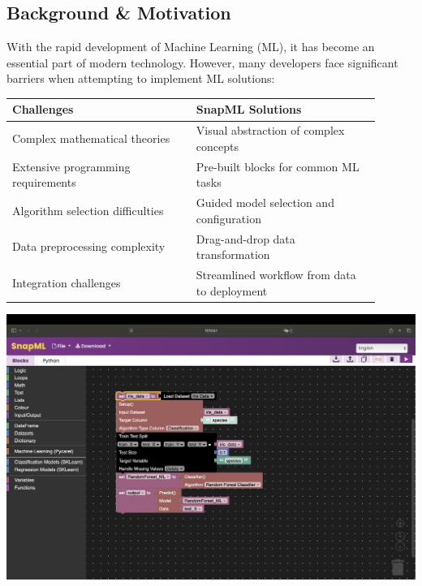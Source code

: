\documentclass[a0paper,portrait]{article}
\begin{document}
\begin{multicols}{2}
\section{Background \& Motivation}

With the rapid development of Machine Learning (ML), it has become an essential part of modern technology. However, many developers face significant barriers when attempting to implement ML solutions:

\begin{minipage}{0.5\linewidth}
\begin{center}
\begin{tabular}{|p{0.45\linewidth}|p{0.45\linewidth}|}
\hline
\textbf{Challenges} & \textbf{SnapML Solutions} \\
\hline
Complex mathematical theories & Visual abstraction of complex concepts \\
\hline
Extensive programming requirements & Pre-built blocks for common ML tasks \\
\hline
Algorithm selection difficulties & Guided model selection and configuration \\
\hline
Data preprocessing complexity & Drag-and-drop data transformation \\
\hline
Integration challenges & Streamlined workflow from data to deployment \\
\hline
\end{tabular}
\end{center}
\end{minipage}
\begin{minipage}{0.48\linewidth}
\includegraphics[width=\linewidth]{加载范例程序.png}
\end{minipage}


\end{multicols}
\end{document}
